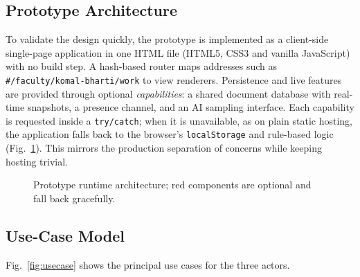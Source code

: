 \documentclass[conference]{IEEEtran}
\begin{document}
\subsection{Prototype Architecture}
To validate the design quickly, the prototype is implemented as a client-side single-page application in one HTML file (HTML5, CSS3 and vanilla JavaScript) with no build step. A hash-based router maps addresses such as \texttt{\#/faculty/komal-bharti/work} to view renderers. Persistence and live features are provided through optional \emph{capabilities}: a shared document database with real-time snapshots, a presence channel, and an AI sampling interface. Each capability is requested inside a \texttt{try/catch}; when it is unavailable, as on plain static hosting, the application falls back to the browser's \texttt{localStorage} and rule-based logic (Fig.~\ref{fig:proto}). This mirrors the production separation of concerns while keeping hosting trivial.

\begin{figure}[t]
\centering
{}
\caption{Prototype runtime architecture; red components are optional and fall back gracefully.}
\label{fig:proto}
\end{figure}

\subsection{Use-Case Model}
Fig.~\ref{fig:usecase} shows the principal use cases for the three actors.
\end{document}
